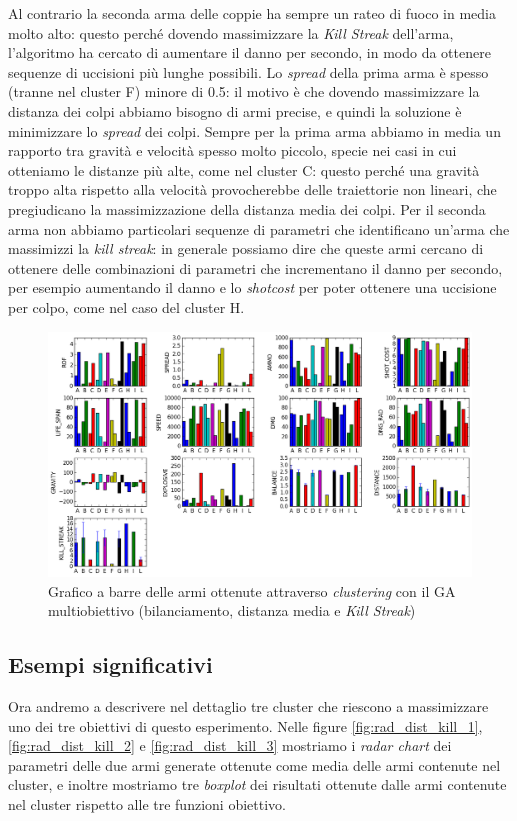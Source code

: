 \documentclass[12pt, italian]{toptesi}
\begin{document}
Al contrario la seconda arma delle coppie ha sempre un rateo di fuoco in media molto alto: questo perché dovendo massimizzare la \emph{Kill Streak} dell'arma, l'algoritmo ha cercato di aumentare il danno per secondo, in modo da ottenere sequenze di uccisioni più lunghe possibili.
Lo \emph{spread} della prima arma è spesso (tranne nel cluster F) minore di 0.5: il motivo è che dovendo massimizzare la distanza dei colpi abbiamo bisogno di armi precise, e quindi la soluzione è minimizzare lo \emph{spread} dei colpi.
Sempre per la prima arma abbiamo in media un rapporto tra gravità e velocità spesso molto piccolo, specie nei casi in cui otteniamo le distanze più alte, come nel cluster C: questo perché una gravità troppo alta rispetto alla velocità provocherebbe delle traiettorie non lineari, che pregiudicano la massimizzazione della distanza media dei colpi.
Per il seconda arma non abbiamo particolari sequenze di parametri che identificano un'arma che massimizzi la \emph{kill streak}: in generale possiamo dire che queste armi cercano di ottenere delle combinazioni di parametri che incrementano il danno per secondo, per esempio aumentando il danno e lo \emph{shotcost} per poter ottenere una uccisione per colpo, come nel caso del cluster H.

\begin{figure}[tp]
\centering
\includegraphics[width=1.2\textwidth, angle=90]{bar_dist_kill}
\caption{Grafico a barre delle armi ottenute attraverso \emph{clustering} con il GA multiobiettivo (bilanciamento, distanza media e \emph{Kill Streak}) }
\label{fig:bar_dist_kill}
\end{figure}


\subsection{Esempi significativi}
Ora andremo a descrivere nel dettaglio tre cluster che riescono a massimizzare uno dei tre obiettivi di questo esperimento.
Nelle figure \ref{fig:rad_dist_kill_1}, \ref{fig:rad_dist_kill_2} e \ref{fig:rad_dist_kill_3} mostriamo i \emph{radar chart} dei parametri delle due armi generate ottenute come media delle armi contenute nel cluster, e inoltre mostriamo tre \emph{boxplot} dei risultati ottenute dalle armi contenute nel cluster rispetto alle tre funzioni obiettivo.
\end{document}
